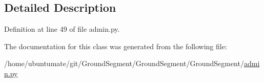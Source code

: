 \subsection{Detailed Description}


Definition at line 49 of file admin.\+py.



The documentation for this class was generated from the following file\+:\begin{DoxyCompactItemize}
\item 
/home/ubuntumate/git/\+Ground\+Segment/\+Ground\+Segment/\+Ground\+Segment/\hyperlink{admin_8py}{admin.\+py}\end{DoxyCompactItemize}
